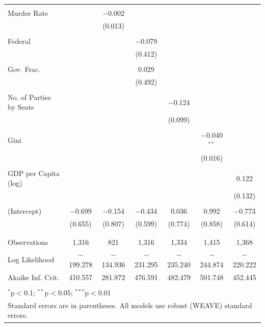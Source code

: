 \documentclass[a4paper]{article}\usepackage[]{graphicx}\usepackage[]{color}
\begin{document}
\begin{table}[H]
\begin{center}
{\begin{tabular}{@{\extracolsep{5pt}}lcccccc}
  & & & & & & \\ 
 Murder Rate &  & $-$0.002 &  &  &  &  \\ 
  &  & (0.013) &  &  &  &  \\ 
  & & & & & & \\ 
 Federal &  &  & $-$0.079 &  &  &  \\ 
  &  &  & (0.412) &  &  &  \\ 
  & & & & & & \\ 
 Gov. Frac. &  &  & 0.029 &  &  &  \\ 
  &  &  & (0.492) &  &  &  \\ 
  & & & & & & \\ 
 No. of Parties by Seats &  &  &  & $-$0.124 &  &  \\ 
  &  &  &  & (0.099) &  &  \\ 
  & & & & & & \\ 
 Gini &  &  &  &  & $-$0.040$^{**}$ &  \\ 
  &  &  &  &  & (0.016) &  \\ 
  & & & & & & \\ 
 GDP per Capita (log) &  &  &  &  &  & 0.122 \\ 
  &  &  &  &  &  & (0.132) \\ 
  & & & & & & \\ 
 (Intercept) & $-$0.699 & $-$0.154 & $-$0.434 & 0.036 & 0.992 & $-$0.773 \\ 
  & (0.655) & (0.807) & (0.599) & (0.774) & (0.858) & (0.614) \\ 
  & & & & & & \\ 
\hline \\[-1.8ex] 
Observations & 1,316 & 821 & 1,316 & 1,334 & 1,415 & 1,368 \\ 
Log Likelihood & $-$199.278 & $-$134.936 & $-$231.295 & $-$235.240 & $-$244.874 & $-$220.222 \\ 
Akaike Inf. Crit. & 410.557 & 281.872 & 476.591 & 482.479 & 501.748 & 452.445 \\ 
\hline 
\hline \\[-1.8ex] 
\multicolumn{7}{l}{$^{*}$p$<$0.1; $^{**}$p$<$0.05; $^{***}$p$<$0.01} \\ 
\multicolumn{7}{l}{Standard errors are in parentheses. All models use robust (WEAVE) standard errors.} \\ 
\end{tabular} 

}
\end{center}
\end{table}
\end{document}
